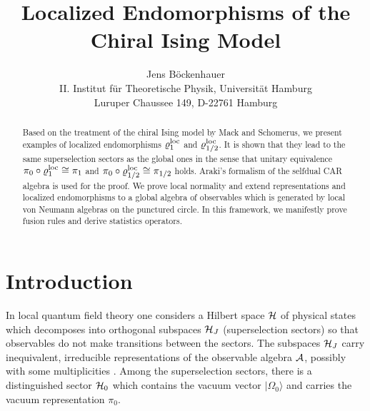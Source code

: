 \documentclass[10pt,a4paper]{article}
\begin{document}
\title{Localized Endomorphisms of the Chiral Ising Model}
\author{Jens B{\"o}ckenhauer\\II. Institut f{\"u}r
Theoretische Physik, Universit{\"a}t Hamburg\\
Luruper Chaussee 149, D-22761 Hamburg}
\maketitle

\begin{abstract}
Based on the treatment of the chiral Ising model
by Mack and Schomerus, we present examples of localized
endomorphisms $\varrho_1^{\rm loc}$ and
$\varrho_{1/2}^{\rm loc}$. It is shown that they
lead to the same superselection sectors as the global
ones in the sense that unitary equivalence
$\pi_0\circ\varrho_1^{\rm loc}\cong\pi_1$ and
$\pi_0\circ\varrho_{1/2}^{\rm loc}\cong\pi_{1/2}$ holds.
Araki's formalism of the selfdual CAR algebra is used
for the proof. We prove local normality and extend
representations and localized endomorphisms to a
global algebra of observables which
is generated by local von Neumann algebras on the
punctured circle. In this framework, we manifestly
prove fusion rules and derive statistics operators.
\end{abstract}

\newcommand{\I}{{\rm i}}
\newcommand{\E}{{\rm e}}
\newtheorem{definition}{Definition}[section]
\newtheorem{theorem}[definition]{Theorem}
\newtheorem{lemma}[definition]{Lemma}
\newtheorem{corollary}[definition]{Corollary}
\newtheorem{proposition}[definition]{Proposition}

\section{Introduction}
In local quantum field theory one considers a Hilbert
space ${\cal H}$ of physical states which decomposes
into orthogonal subspaces ${\cal H}_J$ (superselection
sectors) so that observables do not make transitions
between the sectors. The subspaces ${\cal H}_J$ carry
inequivalent, irreducible representations of the
observable algebra ${\cal A}$, possibly with some
multiplicities \cite{HK}. Among the superselection sectors,
there is a distinguished sector ${\cal H}_0$ which
contains the vacuum vector $|\Omega_0\rangle$ and
carries the vacuum representation $\pi_0$.
\end{document}
